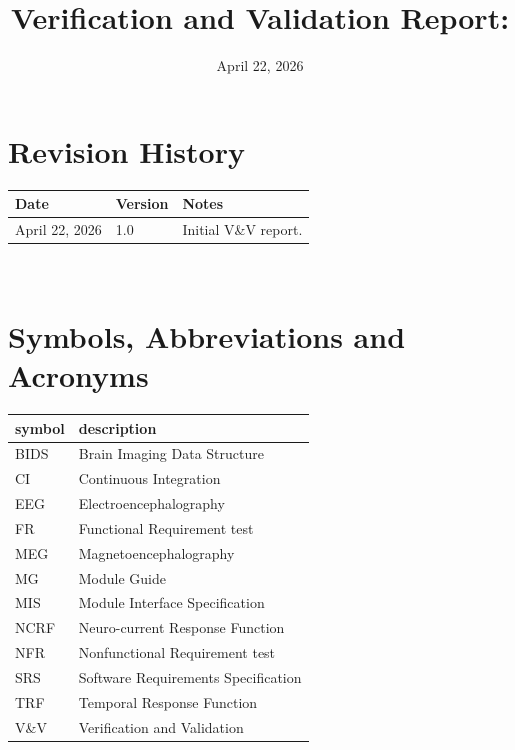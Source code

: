 \documentclass[12pt, titlepage]{article}
\begin{document}
\title{Verification and Validation Report: \progname{}}
\author{\authname}
\date{April 22, 2026}
	
\maketitle


\section{Revision History}

\begin{tabularx}{\textwidth}{p{3cm}p{2cm}X}
\toprule {\bf Date} & {\bf Version} & {\bf Notes}\\
\midrule
April 22, 2026 & 1.0 & Initial V\&V report. \\
\bottomrule
\end{tabularx}

~\newpage

\section{Symbols, Abbreviations and Acronyms}

\renewcommand{\arraystretch}{1.2}
\begin{tabular}{l l}
  \toprule		
  \textbf{symbol} & \textbf{description}\\
  \midrule
  BIDS & Brain Imaging Data Structure\\
  CI & Continuous Integration\\
  EEG & Electroencephalography\\
  FR & Functional Requirement test\\
  MEG & Magnetoencephalography\\
  MG & Module Guide\\
  MIS & Module Interface Specification\\
  NCRF & Neuro-current Response Function\\
  NFR & Nonfunctional Requirement test\\
  SRS & Software Requirements Specification\\
  TRF & Temporal Response Function\\
  V\&V & Verification and Validation\\
  \bottomrule
\end{tabular}\\

\end{document}
